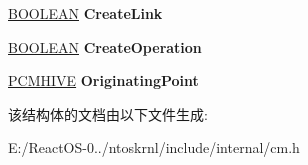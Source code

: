 \begin{DoxyCompactItemize}
\hyperlink{_processor_bind_8h_a112e3146cb38b6ee95e64d85842e380a}{B\+O\+O\+L\+E\+AN} {\bfseries Create\+Link}
\item 
\mbox{\label{struct___c_m___p_a_r_s_e___c_o_n_t_e_x_t_ace8d3b8b7c6262e1d48f83b39399d153}} 
\hyperlink{_processor_bind_8h_a112e3146cb38b6ee95e64d85842e380a}{B\+O\+O\+L\+E\+AN} {\bfseries Create\+Operation}
\item 
\mbox{\label{struct___c_m___p_a_r_s_e___c_o_n_t_e_x_t_a8f29f001555db414106ba43774f2ad76}} 
\hyperlink{struct___c_m_h_i_v_e}{P\+C\+M\+H\+I\+VE} {\bfseries Originating\+Point}
\end{DoxyCompactItemize}


该结构体的文档由以下文件生成\+:\begin{DoxyCompactItemize}
\item 
E\+:/\+React\+O\+S-\/0../ntoskrnl/include/internal/cm.\+h\end{DoxyCompactItemize}
